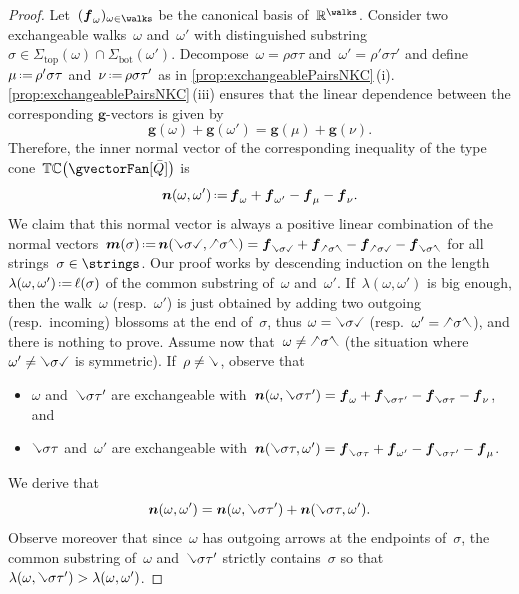 \documentclass{amsart}
\theoremstyle{definition}
\newcommand{\R}{\mathbb{R}} %
\renewcommand{\b}[1]{{\boldsymbol{#1}}} %
\newcommand{\eqdef}{\mbox{\,\raisebox{0.2ex}{\scriptsize\ensuremath{\mathrm:}}\ensuremath{=}\,}} %
\newcommand{\gvector}[1]{\b{g}(#1)} %
\newcommand{\typeCone}{\mathbb{TC}} %
\newcommand{\quiver}{\bar Q} %
\renewcommand{\top}{\mathrm{top}} %
\newcommand{\bottom}{\mathrm{bot}} %
\newcommand{\hL}{\text{\rotatebox[origin=c]{180}{\checked}}}
\newcommand{\hR}{\text{\rotatebox[origin=c]{180}{\reflectbox{\checked}}}}
\newcommand{\cL}{\text{\reflectbox{\checked}}}
\newcommand{\cR}{\text{\checked}}
\newcommand{\hh}[1]{\hL#1\hR} %
\newcommand{\cc}[1]{\cL#1\cR} %
\newcommand{\hc}[1]{\hL#1\cR} %
\newcommand{\ch}[1]{\cL#1\hR} %
\begin{document}
\begin{proof}
Let~$(\b{f}_\omega)_{\omega \in \walks}$ be the canonical basis of~$\R^{\walks}$.
Consider two exchangeable walks~$\omega$ and~$\omega'$ with distinguished substring~$\sigma \in \Sigma_\top(\omega) \cap \Sigma_\bottom(\omega')$.
Decompose~$\omega = \rho \sigma \tau$ and~$\omega' = \rho' \sigma \tau'$ and define~$\mu \eqdef \rho' \sigma \tau$ and~$\nu \eqdef \rho \sigma \tau'$ as in \cref{prop:exchangeablePairsNKC}\,(i). \cref{prop:exchangeablePairsNKC}\,(iii) ensures that the linear dependence between the corresponding $\b{g}$-vectors is given by
\[
\gvector{\omega} + \gvector{\omega'} = \gvector{\mu} + \gvector{\nu}.
\]
Therefore, the inner normal vector of the corresponding inequality of the type cone~$\typeCone \big( \gvectorFan[\quiver] \big)$ is
\[
\b{n}(\omega, \omega') \eqdef \b{f}_\omega + \b{f}_{\omega'} - \b{f}_\mu - \b{f}_\nu.
\]
We claim that this normal vector is always a positive linear combination of the normal vectors~$\b{m}(\sigma) \eqdef \b{n}(\cc{\sigma}, \hh{\sigma}) = \b{f}_{\cc{\sigma}} + \b{f}_{\hh{\sigma}} - \b{f}_{\hc{\sigma}} - \b{f}_{\ch{\sigma}}$ for all strings~$\sigma \in \strings$.
Our proof works by descending induction on the length~$\lambda(\omega,\omega') \eqdef \ell(\sigma)$ of the common substring of~$\omega$ and~$\omega'$.
If~$\lambda(\omega, \omega')$ is big enough, then the walk~$\omega$ (resp.~$\omega'$) is just obtained by adding two outgoing (resp.~incoming) blossoms at the end of~$\sigma$, thus $\omega = \cc{\sigma}$ (resp.~$\omega' = \hh{\sigma}$), and there is nothing to prove.
Assume now that~$\omega \ne \hh{\sigma}$ (the situation where~$\omega' \ne \cc{\sigma}$ is symmetric).
If~$\rho \ne \cL$, observe that
\begin{itemize}
\item $\omega$ and~$\cL \sigma \tau'$ are exchangeable with~$\b{n}(\omega, \cL \sigma \tau') = \b{f}_\omega + \b{f}_{\cL \sigma \tau'} - \b{f}_{\cL \sigma \tau} - \b{f}_\nu$, and
\item $\cL \sigma \tau$ and~$\omega'$ are exchangeable with~$\b{n}(\cL \sigma \tau, \omega') = \b{f}_{\cL \sigma \tau} + \b{f}_{\omega'} - \b{f}_{\cL \sigma \tau'} - \b{f}_\mu$.
\end{itemize}
We derive that
\[
\b{n}(\omega, \omega') = \b{n}(\omega, \cL \sigma \tau') + \b{n}(\cL \sigma \tau, \omega').
\]
Observe moreover that since~$\omega$ has outgoing arrows at the endpoints of~$\sigma$, the common substring of~$\omega$ and~$\cL \sigma \tau'$ strictly contains~$\sigma$ so that $\lambda(\omega, \cL \sigma \tau') > \lambda(\omega, \omega')$.

\end{proof}
\end{document}
